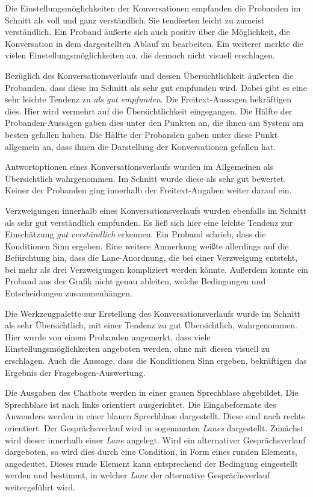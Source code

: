 Die Einstellungsmöglichkeiten der Konversationen empfanden die Probanden im Schnitt als voll und ganz verständlich. Sie tendierten leicht zu zumeist verständlich. Ein Proband äußerte sich auch positiv über die Möglichkeit, die Konversation in dem dargestellten Ablauf zu bearbeiten. Ein weiterer merkte die vielen Einstellungsmöglichkeiten an, die dennoch nicht visuell erschlagen.

Bezüglich des Konversationsverlaufs und dessen Übersichtlichkeit äußerten die Probanden, dass diese im Schnitt als sehr gut empfunden wird. Dabei gibt es eine sehr leichte Tendenz zu \emph{als gut empfunden}. Die Freitext-Aussagen bekräftigen dies. Hier wird vermehrt auf die Übersichtlichkeit eingegangen. Die Hälfte der Probanden-Aussagen gaben dies unter den Punkten an, die ihnen am System am besten gefallen haben. Die Hälfte der Probanden gaben unter diese Punkt allgemein an, dass ihnen die Darstellung der Konversationen gefallen hat.

Antwortoptionen eines Konversationsverlaufs wurden im Allgemeinen als Übersichtlich wahrgenommen. Im Schnitt wurde diese als sehr gut bewertet. Keiner der Probanden ging innerhalb der Freitext-Angaben weiter darauf ein.

Verzweigungen innerhalb eines Konversationsverlaufs wurden ebenfalls im Schnitt als sehr gut verständlich empfunden. Es ließ sich hier eine leichte Tendenz zur Einschätzung \emph{gut verständlich} erkennen. Ein Proband schrieb, dass die Konditionen Sinn ergeben. Eine weitere Anmerkung weißte allerdings auf die Befürchtung hin, dass die Lane-Anordnung, die bei einer Verzweigung entsteht, bei mehr als drei Verzweigungen kompliziert werden könnte. Außerdem konnte ein Proband aus der Grafik nicht genau ableiten, welche Bedingungen und Entscheidungen zusammenhängen. 

Die Werkzeugpalette zur Erstellung des Konversationsverlaufs wurde im Schnitt als sehr Übersichtlich, mit einer Tendenz zu gut Übersichtlich, wahrgenommen. Hier wurde von einem Probanden angemerkt, dass viele Einstellungsmöglichkeiten angeboten werden, ohne mit diesen visuell zu erschlagen. Auch die Aussage, dass die Konditionen Sinn ergeben, bekräftigen das Ergebnis der Fragebogen-Auswertung. 

Die Ausgaben des Chatbots werden in einer grauen Sprechblase abgebildet. Die Sprechblase ist nach links orientiert ausgerichtet. Die Eingabeformate des Anwenders werden in einer blauen Sprechblase dargestellt. Diese sind nach rechts orientiert. Der Gesprächsverlauf wird in sogenannten \emph{Lanes} dargestellt. Zunächst wird dieser innerhalb einer \emph{Lane} angelegt. Wird ein alternativer Gesprächsverlauf dargeboten, so wird dies durch eine Condition, in Form eines runden Elements, angedeutet. Dieses runde Element kann entsprechend der Bedingung eingestellt werden und bestimmt, in welcher \emph{Lane} der alternative Gesprächsverlauf weitergeführt wird. 

